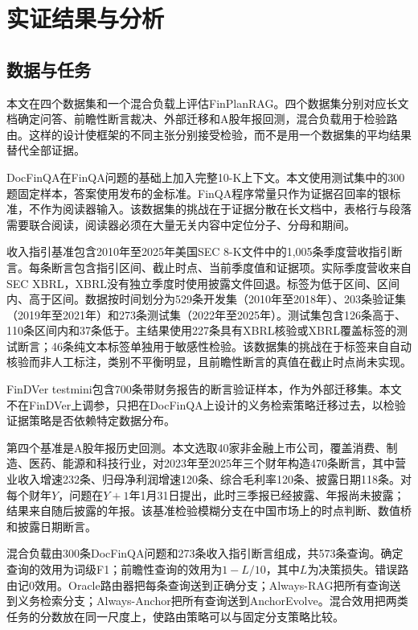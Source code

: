 \chapter{实证结果与分析}
\label{ch:empirical}

\section{数据与任务}

本文在四个数据集和一个混合负载上评估FinPlanRAG。四个数据集分别对应长文档确定问答、前瞻性断言裁决、外部迁移和A股年报回测，混合负载用于检验路由。这样的设计使框架的不同主张分别接受检验，而不是用一个数据集的平均结果替代全部证据。

DocFinQA在FinQA问题的基础上加入完整10-K上下文\citep{reddy2024docfinqa}。本文使用测试集中的300题固定样本，答案使用发布的金标准。FinQA程序常量只作为证据召回率的银标准，不作为阅读器输入。该数据集的挑战在于证据分散在长文档中，表格行与段落需要联合阅读，阅读器必须在大量无关内容中定位分子、分母和期间。

收入指引基准包含2010年至2025年美国SEC 8-K文件中的1,005条季度营收指引断言。每条断言包含指引区间、截止时点、当前季度值和证据项。实际季度营收来自SEC XBRL，XBRL没有独立季度时使用披露文件回退。标签为低于区间、区间内、高于区间。数据按时间划分为529条开发集（2010年至2018年）、203条验证集（2019年至2021年）和273条测试集（2022年至2025年）。测试集包含126条高于、110条区间内和37条低于。主结果使用227条具有XBRL核验或XBRL覆盖标签的测试断言；46条纯文本标签单独用于敏感性检验。该数据集的挑战在于标签来自自动核验而非人工标注，类别不平衡明显，且前瞻性断言的真值在截止时点尚未实现。

FinDVer testmini包含700条带财务报告的断言验证样本\citep{zhao2024findver}，作为外部迁移集。本文不在FinDVer上调参，只把在DocFinQA上设计的义务检索策略迁移过去，以检验证据策略是否依赖特定数据分布。

第四个基准是A股年报历史回测。本文选取40家非金融上市公司，覆盖消费、制造、医药、能源和科技行业，对2023年至2025年三个财年构造470条断言，其中营业收入增速232条、归母净利润增速120条、综合毛利率120条、披露日期118条。对每个财年$Y$，问题在$Y+1$年1月31日提出，此时三季报已经披露、年报尚未披露；结果来自随后披露的年报。该基准检验模糊分支在中国市场上的时点判断、数值桥和披露日期断言。

混合负载由300条DocFinQA问题和273条收入指引断言组成，共573条查询。确定查询的效用为词级F1；前瞻性查询的效用为$1-L/10$，其中$L$为决策损失。错误路由记0效用。Oracle路由器把每条查询送到正确分支；Always-RAG把所有查询送到义务检索分支；Always-Anchor把所有查询送到AnchorEvolve。混合效用把两类任务的分数放在同一尺度上，使路由策略可以与固定分支策略比较。

